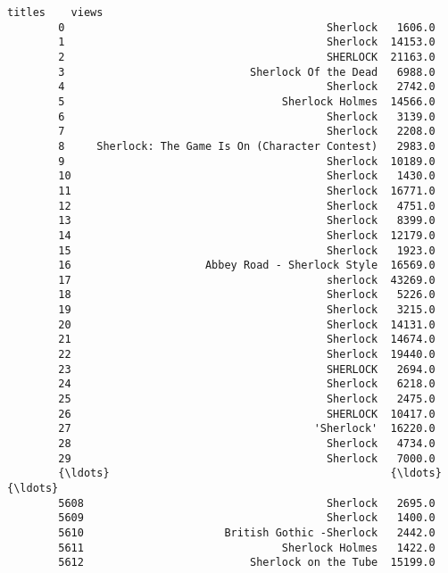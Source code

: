 \documentclass[11pt]{article}
\begin{document}
\begin{Verbatim}[commandchars=\\\{\}]
                                                    titles    views  
        0                                         Sherlock   1606.0  
        1                                         Sherlock  14153.0  
        2                                         SHERLOCK  21163.0  
        3                             Sherlock Of the Dead   6988.0  
        4                                         Sherlock   2742.0  
        5                                  Sherlock Holmes  14566.0  
        6                                         Sherlock   3139.0  
        7                                         Sherlock   2208.0  
        8     Sherlock: The Game Is On (Character Contest)   2983.0  
        9                                         Sherlock  10189.0  
        10                                        Sherlock   1430.0  
        11                                        Sherlock  16771.0  
        12                                        Sherlock   4751.0  
        13                                        Sherlock   8399.0  
        14                                        Sherlock  12179.0  
        15                                        Sherlock   1923.0  
        16                     Abbey Road - Sherlock Style  16569.0  
        17                                        sherlock  43269.0  
        18                                        Sherlock   5226.0  
        19                                        Sherlock   3215.0  
        20                                        Sherlock  14131.0  
        21                                        Sherlock  14674.0  
        22                                        Sherlock  19440.0  
        23                                        SHERLOCK   2694.0  
        24                                        Sherlock   6218.0  
        25                                        Sherlock   2475.0  
        26                                        SHERLOCK  10417.0  
        27                                      'Sherlock'  16220.0  
        28                                        Sherlock   4734.0  
        29                                        Sherlock   7000.0  
        {\ldots}                                            {\ldots}      {\ldots}  
        5608                                      Sherlock   2695.0  
        5609                                      Sherlock   1400.0  
        5610                      British Gothic -Sherlock   2442.0  
        5611                               Sherlock Holmes   1422.0  
        5612                          Sherlock on the Tube  15199.0  

\end{Verbatim}
\end{document}
